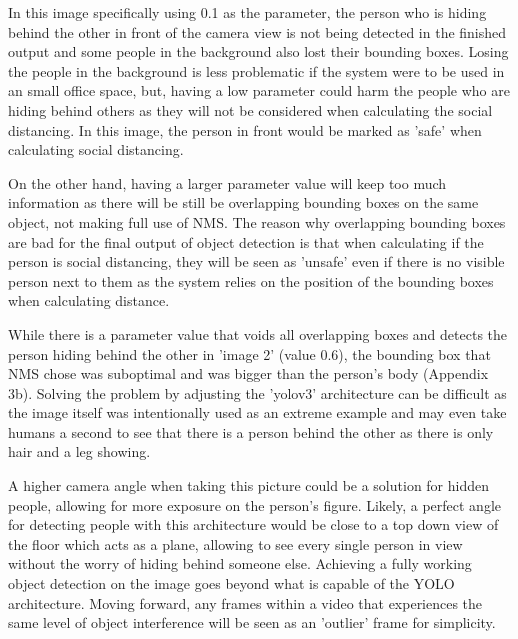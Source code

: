 \documentclass[12pt]{report}
\begin{document}
\vspace{2mm}

In this image specifically using 0.1 as the parameter, the person who is hiding behind the other in front of the camera view is not being detected in the finished output and some people in the background also lost their bounding boxes. Losing the people in the background is less problematic if the system were to be used in an small office space, but, having a low parameter could harm the people who are hiding behind others as they will not be considered when calculating the social distancing. In this image, the person in front would be marked as 'safe' when calculating social distancing.

\vspace{2mm}

On the other hand, having a larger parameter value will keep too much information as there will be still be overlapping bounding boxes on the same object, not making full use of NMS. The reason why overlapping bounding boxes are bad for the final output of object detection is that when calculating if the person is social distancing, they will be seen as 'unsafe' even if there is no visible person next to them as the system relies on the position of the bounding boxes when calculating distance.

\vspace{2mm}

While there is a parameter value that voids all overlapping boxes and detects the person hiding behind the other in 'image 2' (value 0.6), the bounding box that NMS chose was suboptimal and was bigger than the person's body (Appendix 3b). Solving the problem by adjusting the 'yolov3' architecture can be difficult as the image itself was intentionally used as an extreme example and may even take humans a second to see that there is a person behind the other as there is only hair and a leg showing.

\vspace{2mm}

A higher camera angle when taking this picture could be a solution for hidden people, allowing for more exposure on the person's figure. Likely, a perfect angle for detecting people with this architecture would be close to a top down view of the floor which acts as a plane, allowing to see every single person in view without the worry of hiding behind someone else. Achieving a fully working object detection on the image goes beyond what is capable of the YOLO architecture. Moving forward, any frames within a video that experiences the same level of object interference will be seen as an 'outlier' frame for simplicity. 
\end{document}
